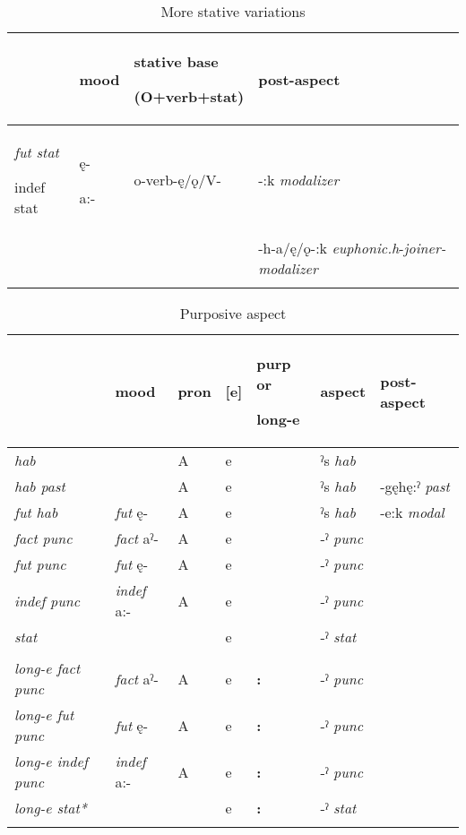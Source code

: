 
\begin{table}
\caption{More stative variations}
\label{tab:1:statvar2}
\scriptsize{
\begin{tabularx}{\textwidth}{XXXX}
\lsptoprule
& mood & stative base

(O+verb+stat) & post-aspect \\
\midrule
{\itshape fut stat

indef stat} & ę-

a:- & o-verb-ę/ǫ/V- & {}-:k \textit{modalizer}\\
&  &  & {}-h-a/ę/ǫ-:k \textit{euphonic.h}{}-\textit{joiner-modalizer}\\
\lspbottomrule
\end{tabularx}}
\end{table}


\begin{table}
\caption{Purposive aspect}
\label{tab:1:purposiveasp}
\scriptsize{
\begin{tabularx}{\textwidth}{XXXXXXX} 
\lsptoprule
& mood & pron & [e] & purp or 

long-e & aspect & post-aspect\\
\midrule
{\itshape hab} &  & A & e &  & ˀs \textit{hab}

& \\
{\itshape hab past} &  & A & e &  & ˀs \textit{hab} & {}-gęhę:ˀ \textit{past}

\\
{\itshape fut hab} & \textit{fut} ę- & A & e &  & ˀs \textit{hab} & {}-e:k \textit{modal}

\\
{\itshape fact punc}

& \textit{fact} aˀ- & A & e &  & {}-ˀ \textit{punc} & \\
{\itshape fut punc}

& \textit{fut} ę- & A & e &  & {}-ˀ \textit{punc} & \\
{\itshape indef punc}

& \textit{indef} a:- & A & e &  & {}-ˀ \textit{punc} & \\
{\itshape stat} &  &  & e &  & {}-ˀ \textit{stat} & \\
&  &  &  &  &  & \\
{\itshape long-e fact punc}

& \textit{fact} aˀ- & A & e & {\bfseries :} & {}-ˀ \textit{punc} & \\
{\itshape long-e fut punc}

& \textit{fut} ę- & A & e & {\bfseries :} & {}-ˀ \textit{punc} & \\
{\itshape long-e indef punc}

& \textit{indef} a:- & A & e & {\bfseries :} & {}-ˀ \textit{punc} & \\
{\itshape long-e stat*} &  &  & e & {\bfseries :} & {}-ˀ \textit{stat} & \\
\lspbottomrule
\end{tabularx}}
\end{table}

